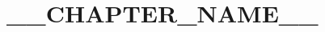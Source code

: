 \documentclass[../main.tex]{subfiles}
\begin{document}
%
%
%
%
% 
%
%
%
%

\chapter{__CHAPTER_NAME__}
\end{document}
